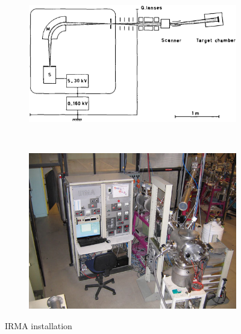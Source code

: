 \begin{figure}[!ht]
	\begin{subfigure}{0.5\textwidth}
		\includegraphics[width=\textwidth]{04_IPHI_Test/figures/fig000_IRMA01.png}
		\caption{}
		\label{}
	\end{subfigure}
	~
	\begin{subfigure}{0.5\textwidth}
		\includegraphics[width=\textwidth]{04_IPHI_Test/figures/fig000_IRMA02.jpg}
		\caption{}
		\label{}
	\end{subfigure}
	\caption[IRMA installation]{IRMA installation}
	\label{chap4:IRMA_setup}
\end{figure}

